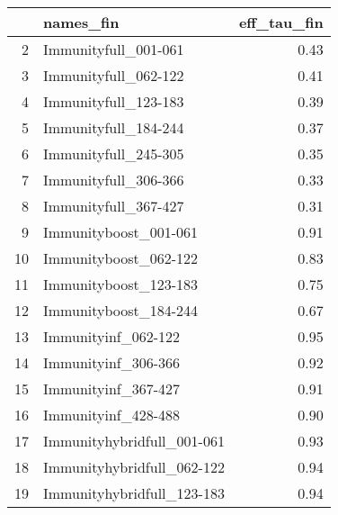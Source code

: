 \begin{table}[ht]
\centering
\begin{tabular}{rlr}
  \hline
 & names\_fin & eff\_tau\_fin \\ 
  \hline
2 & Immunityfull\_001-061 & 0.43 \\ 
  3 & Immunityfull\_062-122 & 0.41 \\ 
  4 & Immunityfull\_123-183 & 0.39 \\ 
  5 & Immunityfull\_184-244 & 0.37 \\ 
  6 & Immunityfull\_245-305 & 0.35 \\ 
  7 & Immunityfull\_306-366 & 0.33 \\ 
  8 & Immunityfull\_367-427 & 0.31 \\ 
  9 & Immunityboost\_001-061 & 0.91 \\ 
  10 & Immunityboost\_062-122 & 0.83 \\ 
  11 & Immunityboost\_123-183 & 0.75 \\ 
  12 & Immunityboost\_184-244 & 0.67 \\ 
  13 & Immunityinf\_062-122 & 0.95 \\ 
  14 & Immunityinf\_306-366 & 0.92 \\ 
  15 & Immunityinf\_367-427 & 0.91 \\ 
  16 & Immunityinf\_428-488 & 0.90 \\ 
  17 & Immunityhybridfull\_001-061 & 0.93 \\ 
  18 & Immunityhybridfull\_062-122 & 0.94 \\ 
  19 & Immunityhybridfull\_123-183 & 0.94 \\ 
   \hline
\end{tabular}
\end{table}

